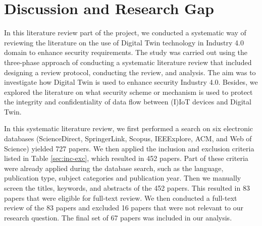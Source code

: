 
\section{Discussion and Research Gap}


In this literature review part of the project, we conducted a systematic way of reviewing the literature on the use of Digital Twin technology in Industry 4.0 domain to enhance security requirements. The study was carried out using the three-phase approach of conducting a systematic literature review that included designing a review protocol, conducting the review, and analysis. The aim was to investigate how Digital Twin is used to enhance security Industry 4.0. Besides, we explored the literature on what security scheme or mechanism is used to protect the integrity and confidentiality of data flow between (I)IoT devices and Digital Twin.


In this systematic literature review, we first performed a search on six electronic databases (ScienceDirect, SpringerLink, Scopus, IEEExplore, ACM, and Web of Science) yielded 727 papers. We then applied the inclusion and exclusion criteria listed in Table \ref{sec:inc-exc}, which resulted in 452 papers. Part of these criteria were already applied during the database search, such as the language, publication type, subject categories and publication year. Then we manually screen the titles, keywords, and abstracts of the 452 papers. This resulted in 83 papers that were eligible for full-text review. We then conducted a full-text review of the 83 papers and excluded 16 papers that were not relevant to our research question. The final set of 67 papers was included in our analysis.


